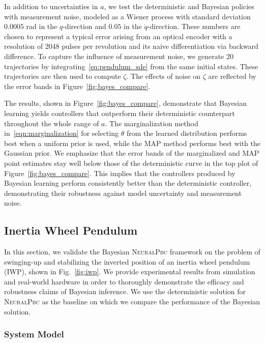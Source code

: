 In addition to uncertainties in $a$, we test the deterministic and Bayesian
policies with measurement noise, modeled as a Wiener process with standard
deviation $0.0005$ \unit{rad} in the $q$-direction and $0.05$ 
in the $\dot{q}$-direction.
%
These numbers are chosen to represent a typical error arising from an
optical encoder with a resolution of 2048 pulses per revolution and its naive
differentiation via backward difference.
%
To capture the influence of measurement noise, we generate 20 trajectories
by integrating~\eqref{eq:pendulum_sde} from the same initial states. 
%
These trajectories are then used to compute $\zeta$. 
%
The effects of noise on $\zeta$ are reflected by the error bands in
Figure~\ref{fig:bayes_compare}.

The results, shown in Figure~\ref{fig:bayes_compare}, demonstrate that Bayesian
learning yields controllers that outperform their deterministic counterpart
throughout the whole range of $a$.
%
The marginalization method in~\eqref{eqn:marginalization} for selecting $\theta$
from the learned distribution performs best when a uniform prior is used, while
the MAP method performs best with the Gaussian prior.
%
We emphasize that the error bands of the marginalized and MAP point
estimates stay well below those of the deterministic curve in the top plot of
Figure~\ref{fig:bayes_compare}.
%
This implies that the controllers produced by Bayesian learning perform
consistently better than the deterministic controller, demonstrating their
robustness against model uncertainty and measurement noise.



\subsection{Inertia Wheel Pendulum}
\label{subsec:iwp}
In this section, we validate the Bayesian \textsc{NeuralPbc} framework on the
problem of swinging-up and stabilizing the inverted position of an inertia wheel
pendulum (IWP), shown in Fig.~\ref{fig:iwp}. We provide experimental results
from simulation and real-world hardware in order to thoroughly demonstrate the
efficacy and robustness claims of Bayesian inference. 
%
We use the deterministic solution for \textsc{NeuralPbc} as the baseline on
which we compare the performance of the Bayesian solution. 

\subsubsection{System Model}

